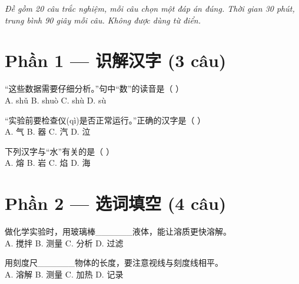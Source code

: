 \documentclass[11pt, a4paper]{article}
\begin{document}

\vspace{0.2cm}
\noindent\emph{Đề gồm 20 câu trắc nghiệm, mỗi câu chọn một đáp án đúng. Thời gian 30 phút, trung bình 90 giây mỗi câu. Không được dùng từ điển.}

\vspace{0.1cm}
\section*{Phần 1 — 识解汉字 (3 câu)}

\begin{baitap}[1]
“这些数据需要仔细分析。”句中“数”的读音是（ ）\\[4pt]
A. shǔ \quad B. shuò \quad C. shù \quad D. sù
\end{baitap}

\begin{baitap}[2]
“实验前要检查仪(qì)是否正常运行。”正确的汉字是（ ）\\[4pt]
A. 气 \quad B. 器 \quad C. 汽 \quad D. 泣
\end{baitap}

\begin{baitap}[3]
下列汉字与“水”有关的是（ ）\\[4pt]
A. 熔 \quad B. 岩 \quad C. 焰 \quad D. 海
\end{baitap}

\section*{Phần 2 — 选词填空 (4 câu)}

\begin{baitap}[4]
做化学实验时，用玻璃棒\_\_\_\_\_\_液体，能让溶质更快溶解。\\[4pt]
A. 搅拌 \quad B. 测量 \quad C. 分析 \quad D. 过滤
\end{baitap}

\begin{baitap}[5]
用刻度尺\_\_\_\_\_\_物体的长度，要注意视线与刻度线相平。\\[4pt]
A. 溶解 \quad B. 测量 \quad C. 加热 \quad D. 记录
\end{baitap}
\end{document}
